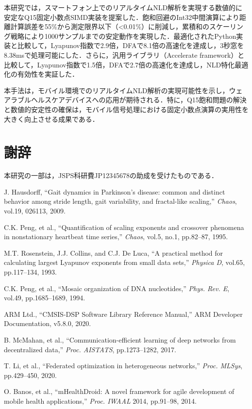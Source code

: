 \documentclass[paper]{ieice}
\begin{document}
本研究では，スマートフォン上でのリアルタイムNLD解析を実現する数値的に安定なQ15固定小数点SIMD実装を提案した．飽和回避のInt32中間演算により距離計算誤差を55\%から測定限界以下（<0.01\%）に削減し，累積和のスケーリング戦略により1000サンプルまでの安定動作を実現した．最適化されたPython実装と比較して，Lyapunov指数で2.9倍，DFAで8.1倍の高速化を達成し，3秒窓を8.38msで処理可能にした．さらに，汎用ライブラリ（Accelerate framework）と比較して，Lyapunov指数で1.5倍，DFAで2.7倍の高速化を達成し，NLD特化最適化の有効性を実証した．

本手法は，モバイル環境でのリアルタイムNLD解析の実現可能性を示し，ウェアラブルヘルスケアデバイスへの応用が期待される．特に，Q15飽和問題の解決と数値的安定性の確保は，モバイル信号処理における固定小数点演算の実用性を大きく向上させる成果である．

\section*{謝辞}
本研究の一部は，JSPS科研費JP12345678の助成を受けたものである．

\begin{thebibliography}{99}
J. Hausdorff, ``Gait dynamics in Parkinson's disease: common and distinct behavior among stride length, gait variability, and fractal-like scaling,'' \textit{Chaos}, vol.19, 026113, 2009.

C.K. Peng, et al., ``Quantification of scaling exponents and crossover phenomena in nonstationary heartbeat time series,'' \textit{Chaos}, vol.5, no.1, pp.82--87, 1995.


M.T. Rosenstein, J.J. Collins, and C.J. De Luca, ``A practical method for calculating largest Lyapunov exponents from small data sets,'' \textit{Physica D}, vol.65, pp.117--134, 1993.

C.K. Peng, et al., ``Mosaic organization of DNA nucleotides,'' \textit{Phys. Rev. E}, vol.49, pp.1685--1689, 1994.

ARM Ltd., ``CMSIS-DSP Software Library Reference Manual,'' ARM Developer Documentation, v5.8.0, 2020.

B. McMahan, et al., ``Communication-efficient learning of deep networks from decentralized data,'' \textit{Proc. AISTATS}, pp.1273--1282, 2017.

T. Li, et al., ``Federated optimization in heterogeneous networks,'' \textit{Proc. MLSys}, pp.429--450, 2020.

O. Banos, et al., ``mHealthDroid: A novel framework for agile development of mobile health applications,'' \textit{Proc. IWAAL} 2014, pp.91--98, 2014.

\end{thebibliography}
\end{document}
